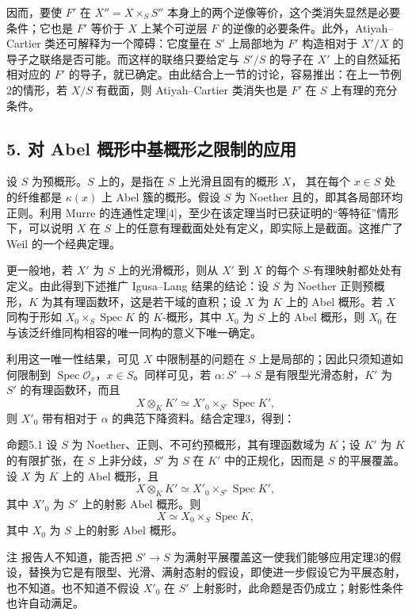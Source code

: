因而，要使 $F'$ 在 $X''=X\times_SS''$ 本身上的两个逆像等价，这个类消失显然是必要条件；它也是 $F'$ 等价于 $X$ 上某个可逆层 $F$ 的逆像的必要条件。此外，Atiyah--Cartier 类还可解释为一个障碍：它度量在 $S'$ 上局部地为 $F'$ 构造相对于 $X'/X$ 的导子之联络是否可能。而这样的联络只要给定与 $S'/S$ 的导子在 $X'$ 上的自然延拓相对应的 $F'$ 的导子，就已确定。由此结合上一节的讨论，容易推出：在上一节例2的情形，若 $X/S$ 有截面，则 Atiyah--Cartier 类消失也是 $F'$ 在 $S$ 上有理的充分条件。

\subsection*{5. 对 Abel 概形中基概形之限制的应用}
设 $S$ 为预概形。$S$ 上的，是指在 $S$ 上光滑且固有的概形 $X$，
其在每个 $x\in S$ 处的纤维都是 $\kappa(x)$ 上 Abel 簇的概形。假设 $S$ 为 Noether 且的，即其各局部环均正则。利用 Murre 的连通性定理[4]，至少在该定理当时已获证明的“等特征”情形下，可以说明 $X$ 在 $S$ 上的任意有理截面处处有定义，即实际上是截面。这推广了 Weil 的一个经典定理。

更一般地，若 $X'$ 为 $S$ 上的光滑概形，则从 $X'$ 到 $X$ 的每个 $S$-有理映射都处处有定义。由此得到下述推广 Igusa--Lang 结果的结论：设 $S$ 为 Noether 正则预概形，$K$ 为其有理函数环，这是若干域的直积；设 $X$ 为 $K$ 上的 Abel 概形。若 $X$ 同构于形如 $X_0\times_S\operatorname{Spec}K$ 的 $K$-概形，其中 $X_0$ 为 $S$ 上的 Abel 概形，则 $X_0$ 在与该泛纤维同构相容的唯一同构的意义下唯一确定。

利用这一唯一性结果，可见 $X$ 中限制基的问题在 $S$ 上是局部的；因此只须知道如何限制到 $\operatorname{Spec}\mathcal O_x$，$x\in S$。同样可见，若 $\alpha:S'\to S$ 是有限型光滑态射，$K'$ 为 $S'$ 的有理函数环，而且
\[
X\otimes_KK'\simeq X'_0\times_{S'}\operatorname{Spec}K',
\]
则 $X'_0$ 带有相对于 $\alpha$ 的典范下降资料。结合定理3，得到：
\begin{statement}{命题5.1}
设 $S$ 为 Noether、正则、不可约预概形，其有理函数域为 $K$；设 $K'$ 为 $K$ 的有限扩张，在 $S$ 上非分歧，$S'$ 为 $S$ 在 $K'$ 中的正规化，因而是 $S$ 的平展覆盖。设 $X$ 为 $K$ 上的 Abel 概形，且
\[
X\otimes_KK'\simeq X'_0\times_{S'}\operatorname{Spec}K',
\]
其中 $X'_0$ 为 $S'$ 上的射影 Abel 概形。则
\[
X\simeq X_0\times_S\operatorname{Spec}K,
\]
其中 $X_0$ 为 $S$ 上的射影 Abel 概形。
\end{statement}
\begin{statement}{注}
报告人不知道，能否把 $S'\to S$ 为满射平展覆盖这一使我们能够应用定理3的假设，替换为它是有限型、光滑、满射态射的假设，即使进一步假设它为平展态射，也不知道。也不知道不假设 $X'_0$ 在 $S'$ 上射影时，此命题是否仍成立；射影性条件也许自动满足。
\end{statement}


